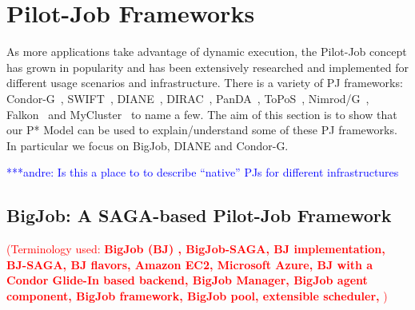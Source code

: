 \documentclass[conference,final]{IEEEtran}
\makeatletter
\def\reduwave{\bgroup \markoverwith{\lower3.5\p@\hbox{\sixly \textcolor{red}{\char58}}}\ULon}
\newcommand{\terminology}[1]{ {\textcolor{red} {(Terminology used: \textbf{#1}) }}}
\newcommand{\jwave}[1]{ {\reduwave{#1}}}
\newcommand{\jhanote}[1]{ {\textcolor{red} { ***shantenu: #1 }}}
\newcommand{\alnote}[1]{ {\textcolor{blue} { ***andre: #1 }}}
\newcommand{\terminology}[1]{}
\newcommand{\jwave}[1]{#1}
\newcommand{\alnote}[1]{}
\newcommand{\jhanote}[1]{}
\newcommand{\cu}{CU\xspace}
\newcommand{\upp}{\vspace*{-0.5em}}
\makeatother
\begin{document}


 



\section{Pilot-Job Frameworks\upp\upp}

As more applications take advantage of dynamic execution, the
Pilot-Job concept has grown in popularity and has been extensively
researched and implemented for different usage scenarios and
infrastructure. There is a variety of PJ frameworks:
Condor-G~\cite{condor-g}, SWIFT~\cite{Wilde2011},
DIANE~\cite{Moscicki:908910}, DIRAC~\cite{1742-6596-219-6-062049},
PanDA~\cite{1742-6596-219-6-062041}, ToPoS~\cite{topos},
Nimrod/G~\cite{10.1109/HPC.2000.846563}, Falkon~\cite{1362680} and
MyCluster~\cite{1652061} to name a few. The aim of this section is to
show that our P* Model can be used to explain/understand some of these
PJ frameworks. In particular we focus on BigJob, DIANE and Condor-G.

\alnote{Is this a place to to describe ``native'' PJs for different 
infrastructures}

\subsection{BigJob: A SAGA-based Pilot-Job Framework\upp\upp}
\label{sec:bigjob_description}
\terminology{BigJob (BJ) , BigJob-SAGA, BJ implementation,  BJ-SAGA, BJ flavors, Amazon EC2, Microsoft Azure,
 BJ with a Condor Glide-In based backend,  BigJob Manager, BigJob agent component, BigJob framework,
 BigJob pool, extensible scheduler, } 
\end{document}
